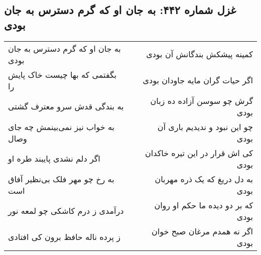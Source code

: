 \begin{center}
\section*{غزل شماره ۴۴۲: به جان او که گرم دسترس به جان بودی}
\label{sec:sh442}
\begin{longtable}{l p{0.5cm} r}
به جان او که گرم دسترس به جان بودی
&&
کمینه پیشکش بندگانش آن بودی
\\
بگفتمی که بها چیست خاک پایش را
&&
اگر حیات گران مایه جاودان بودی
\\
به بندگی قدش سرو معترف گشتی
&&
گرش چو سوسن آزاده ده زبان بودی
\\
به خواب نیز نمی‌بینمش چه جای وصال
&&
چو این نبود و ندیدیم باری آن بودی
\\
اگر دلم نشدی پایبند طره او
&&
کی اش قرار در این تیره خاکدان بودی
\\
به رخ چو مهر فلک بی‌نظیر آفاق است
&&
به دل دریغ که یک ذره مهربان بودی
\\
درآمدی ز درم کاشکی چو لمعه نور
&&
که بر دو دیده ما حکم او روان بودی
\\
ز پرده ناله حافظ برون کی افتادی
&&
اگر نه همدم مرغان صبح خوان بودی
\\
\end{longtable}
\end{center}
